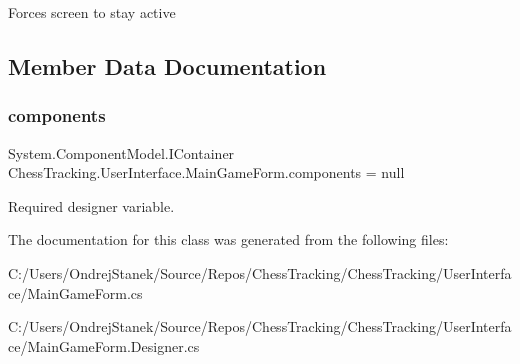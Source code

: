 Forces screen to stay active 



\subsection{Member Data Documentation}
\mbox{\label{class_chess_tracking_1_1_user_interface_1_1_main_game_form_a4b5439262b37e795a0c642d3558ee1cf}} 
\subsubsection{\texorpdfstring{components}{components}}
{\footnotesize\ttfamily System.\+Component\+Model.\+I\+Container Chess\+Tracking.\+User\+Interface.\+Main\+Game\+Form.\+components = null\hspace{0.3cm}{\ttfamily [private]}}



Required designer variable. 



The documentation for this class was generated from the following files\+:\begin{DoxyCompactItemize}
\item 
C\+:/\+Users/\+Ondrej\+Stanek/\+Source/\+Repos/\+Chess\+Tracking/\+Chess\+Tracking/\+User\+Interface/Main\+Game\+Form.\+cs\item 
C\+:/\+Users/\+Ondrej\+Stanek/\+Source/\+Repos/\+Chess\+Tracking/\+Chess\+Tracking/\+User\+Interface/Main\+Game\+Form.\+Designer.\+cs\end{DoxyCompactItemize}
